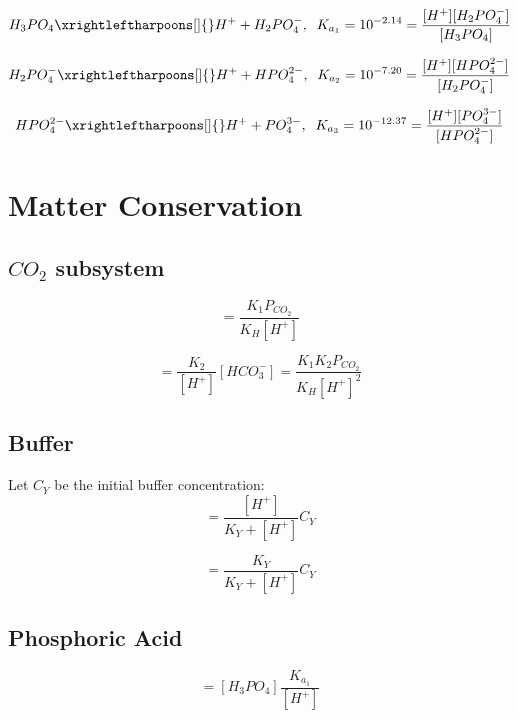 \documentclass[aps,12pt]{revtex4}
\begin{document}
\begin{equation}
	H_3PO_4 \xrightleftharpoons[]{} H^+ + H_2PO_4^-, \;\; K_{a_1} = 10^{-2.14} = \dfrac{[H^+][H_2PO_4^-]}{[H_3PO_4]}
\end{equation}

\begin{equation}
	H_2PO_4^- \xrightleftharpoons[]{} H^+ + HPO_4^{2-}, \;\; K_{a_2} = 10^{-7.20} = \dfrac{[H^+][HPO_4^{2-}]}{[H_2PO_4^-]}
\end{equation}


\begin{equation}
	HPO_4^{2-} \xrightleftharpoons[]{} H^+ +  PO_4^{3-}, \;\; K_{a_3} = 10^{-12.37} = \dfrac{[H^+][PO_4^{3-}]}{[HPO_4^{2-}]}
\end{equation}


\section{Matter Conservation}

\subsection{$CO_2$ subsystem}
\begin{equation}
[HCO_3^-] = \dfrac{K_1 P_{CO_2}}{K_H [H^+] } 
\end{equation}

\begin{equation}
[CO_3^{2-}] = \dfrac{K_2}{[H^+] }  [HCO_3^-]  = \dfrac{K_1 K_2 P_{CO_2}}{K_H [H^+]^2 } 
\end{equation}

\subsection{Buffer}
Let $C_Y$ be the initial buffer concentration:
\begin{equation}
	[HY] = \dfrac{[H^+]}{K_Y + [H^+]} C_Y
\end{equation}

\begin{equation}
	[Y^-] = \dfrac{K_Y}{K_Y + [H^+]} C_Y
\end{equation}


\subsection{Phosphoric Acid}

\begin{equation}
	[H_2PO_4^-] = [H_3PO_4] \dfrac{K_{a_1}}{[H^+]}
\end{equation}
\end{document}
